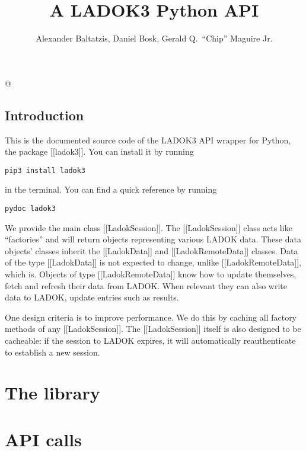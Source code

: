 \documentclass[a4paper]{report}
\title{%
  A LADOK3 Python API
}
\author{%
  Alexander Baltatzis,
  Daniel Bosk,
  Gerald Q.\ \enquote{Chip} Maguire Jr.
}
\affil{%
  KTH EECS\\
  \texttt{\{alba,dbosk,maguire\}@kth.se}
}
\begin{document}
\maketitle

\vspace*{\fill}
\clearpage

\begin{abstract}
  
\end{abstract}
\clearpage

\tableofcontents
\clearpage

@
\chapter{Introduction}

This is the documented source code of the LADOK3 API wrapper for Python, the 
package [[ladok3]].
You can install it by running
\begin{verbatim}
pip3 install ladok3
\end{verbatim}
in the terminal.
You can find a quick reference by running
\begin{verbatim}
pydoc ladok3
\end{verbatim}

We provide the main class [[LadokSession]].
The [[LadokSession]] class acts like \enquote{factories} and will return 
objects representing various LADOK data.
These data objects' classes inherit the [[LadokData]] and [[LadokRemoteData]] 
classes.
Data of the type [[LadokData]] is not expected to change, unlike 
[[LadokRemoteData]], which is.
Objects of type [[LadokRemoteData]] know how to update themselves, \ie fetch 
and refresh their data from LADOK.
When relevant they can also write data to LADOK, \ie update entries such as 
results.

One design criteria is to improve performance.
We do this by caching all factory methods of any [[LadokSession]].
The [[LadokSession]] itself is also designed to be cacheable: if the session to 
LADOK expires, it will automatically reauthenticate to establish a new session.


\part{The library}




\part{API calls}
\end{document}
